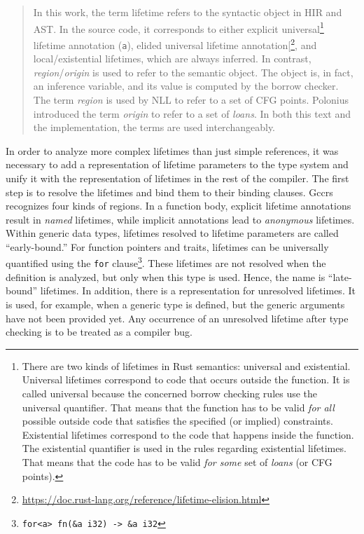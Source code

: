 \documentclass[
  11pt,
  twoside]{report}
\DeclareRobustCommand{\href}[2]{#2\footnote{\url{#1}}}
\begin{document}
\begin{quote}
In this work, the term lifetime refers to the syntactic object in HIR
and AST. In the source code, it corresponds to either explicit
universal\footnote{There are two kinds of lifetimes in Rust semantics:
  universal and existential. Universal lifetimes correspond to code that
  occurs outside the function. It is called universal because the
  concerned borrow checking rules use the universal quantifier. That
  means that the function has to be valid \emph{for all} possible
  outside code that satisfies the specified (or implied) constraints.
  Existential lifetimes correspond to the code that happens inside the
  function. The existential quantifier is used in the rules regarding
  existential lifetimes. That means that the code has to be valid
  \emph{for some} set of \emph{loans} (or CFG points).} lifetime
annotation (\texttt{\textquotesingle{}a}), elided universal lifetime
annotation\href{https://doc.rust-lang.org/reference/lifetime-elision.html}{{[}\citeproc{ref-reference}{14}{]}},
and local/existential lifetimes, which are always inferred. In contrast,
\emph{region}/\emph{origin} is used to refer to the semantic object. The
object is, in fact, an inference variable, and its value is computed by
the borrow checker. The term \emph{region} is used by NLL to refer to a
set of CFG points. Polonius introduced the term \emph{origin} to refer
to a set of \emph{loans}. In both this text and the implementation, the
terms are used interchangeably.
\end{quote}

In order to analyze more complex lifetimes than just simple references,
it was necessary to add a representation of lifetime parameters to the
type system and unify it with the representation of lifetimes in the
rest of the compiler. The first step is to resolve the lifetimes and
bind them to their binding clauses. Gccrs recognizes four kinds of
regions. In a function body, explicit lifetime annotations result in
\emph{named} lifetimes, while implicit annotations lead to
\emph{anonymous} lifetimes. Within generic data types, lifetimes
resolved to lifetime parameters are called ``early-bound.'' For function
pointers and traits, lifetimes can be universally quantified using the
\texttt{for} clause\footnote{\texttt{for\textless{}\textquotesingle{}a\textgreater{}\ fn(\&\textquotesingle{}a\ i32)\ -\textgreater{}\ \&\textquotesingle{}a\ i32}}.
These lifetimes are not resolved when the definition is analyzed, but
only when this type is used. Hence, the name is ``late-bound''
lifetimes. In addition, there is a representation for unresolved
lifetimes. It is used, for example, when a generic type is defined, but
the generic arguments have not been provided yet. Any occurrence of an
unresolved lifetime after type checking is to be treated as a compiler
bug.
\end{document}
